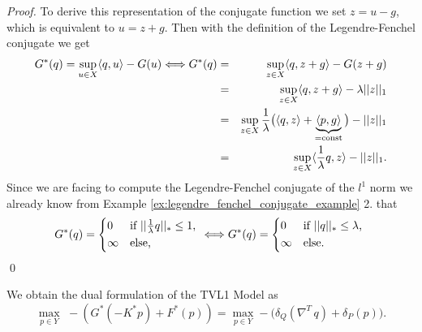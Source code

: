             \begin{proof}
                To derive this representation of the conjugate function we set $z = u - g$, which is equivalent to $u = z + g$. Then with the definition of the Legendre-Fenchel conjugate we get
                    \begin{eqnarray}
                        G^{\ast}(q) = \sup_{u \in X} \langle q, u \rangle - G(u) \Longleftrightarrow G^{\ast}(q) &=& \sup_{z \in X} \langle q, z + g \rangle - G(z + g) \notag \\
                        &=& \sup_{z \in X} \langle q, z + g \rangle - \lambda ||z||_{1} \notag \\
                        &=& \sup_{z \in X} \frac{1}{\lambda} \big(\langle q, z \rangle + \underbrace{\langle p, g \rangle}_{= \textnormal{const}} \big) - ||z||_{1} \notag \\
                        &=& \sup_{z \in X} \langle \frac{1}{\lambda} q, z \rangle - ||z||_{1}.
                    \end{eqnarray}
                Since we are facing to compute the Legendre-Fenchel conjugate of the $l^{1}$ norm we already know from Example \ref{ex:legendre_fenchel_conjugate_example} 2. that
                    $$
                        G^{\ast}(q) =
                            \begin{dcases*}
                                0 & \textnormal{if $||\frac{1}{\lambda}q||_{\ast} \le 1$,} \\
                                \infty & \textnormal{else},
                            \end{dcases*} \Longleftrightarrow
                        G^{\ast}(q) =
                            \begin{dcases*}
                                0 & \textnormal{if $||q||_{\ast} \le \lambda$,} \\
                                \infty & \textnormal{else}.
                            \end{dcases*}
                    $$\qed
            \end{proof}
        We obtain the dual formulation of the TVL1 Model as
            \begin{equation}
                \max_{p \in Y}\,\, -(G^{\ast}(-K^{\ast}p) + F^{\ast}(p)) = \max_{p \in Y} -\bigg( \delta_{Q}(\nabla^{T}\,q) + \delta_{P}(p) \bigg).
            \label{eq:dual_tvl1_problem}
            \end{equation}
    
